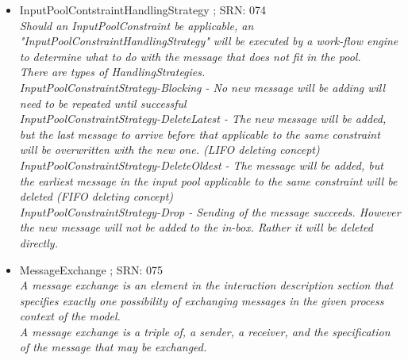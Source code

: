 \begin{itemize}
\begin{itemize}
\begin{itemize}
\begin{itemize}
{						E.g. "Only one order from the same customer" (during happy hour at the bar)}
					\item MessageTypeConstraint ; SRN: 072 \\ \textit{An InputPool constraint that limits the number of message of a certain type in the input pool.\\
						E.g. You can accept only "three request at once}
					\item SenderTypeConstraint ; SRN: 073 \\ \textit{An InputPool constraint that limits the number of message from a certain Sender subject in the input pool.\\
						E.g. as long as a customer has non non-fulfilled request of any type he may not place messages}
				\end{itemize}
				\item InputPoolContstraintHandlingStrategy ; SRN: 074 \\ \textit{Should an InputPoolConstraint be applicable, an "InputPoolConstraintHandlingStrategy" will be executed by a work-flow engine to determine what to do with the message that does not fit in the pool.\\
					There are types of HandlingStrategies. \\
					InputPoolConstraintStrategy-Blocking - No new message will be adding will need to be repeated until successful \\
					InputPoolConstraintStrategy-DeleteLatest - The new message will be added, but the last message to arrive before that applicable to the same constraint will be overwritten with the new one. (LIFO deleting concept)\\
					InputPoolConstraintStrategy-DeleteOldest - The message will be added, but the earliest message in the input pool applicable to the same constraint will be deleted (FIFO deleting concept)\\
					InputPoolConstraintStrategy-Drop - Sending of the message succeeds. However the new message will not be added to the in-box. Rather it will be deleted directly.}
				\item MessageExchange ; SRN: 075 \\ \textit{A message exchange is an element in the interaction description section that specifies exactly one possibility of exchanging messages in the given process context of the model.\\
					A message exchange is a triple of, a sender, a receiver, and the specification of the message that may be exchanged.\\
}
\end{itemize}
\end{itemize}
\end{itemize}
